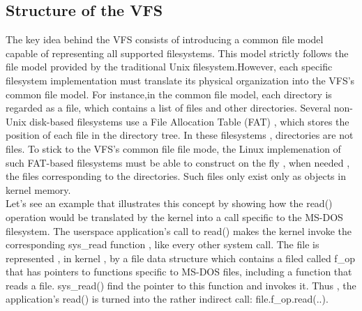 \documentclass[conference]{IEEEtran}
\begin{document}
\subsection{Structure of the VFS}
The key idea behind the VFS consists of introducing a common file model capable of representing all supported 
filesystems. This model strictly follows the file model provided by the traditional Unix filesystem.However, each specific 
filesystem implementation must translate its physical organization into the VFS's common file model. For instance,in the 
common file model, each directory is regarded as a file, which contains a list of files and other directories. Several 
non-Unix disk-based filesystems use a File Allocation Table (FAT) , which stores the position of each file in the 
directory tree. In these filesystems , directories are not files. To stick to the VFS's common file file mode, the Linux
implemenation of such FAT-based filesystems must be able to construct on the fly , when needed , the files corresponding
to the directories. Such files only exist only as objects in kernel memory.\\

Let's see an example that illustrates this concept by showing how the read() operation would be translated by the kernel
into a call specific to the MS-DOS filesystem. The userspace application's call to read() makes the kernel invoke the  
corresponding sys\_read function , like every other system call. The file is represented , in kernel , by a file data
structure which contains a filed called f\_op that has pointers to functions specific to MS-DOS files, including a function
that reads a file. sys\_read() find the pointer to this function and invokes it. Thus , the application's read() is turned
into the rather indirect call: file.f\_op.read(..). \\
\end{document}
